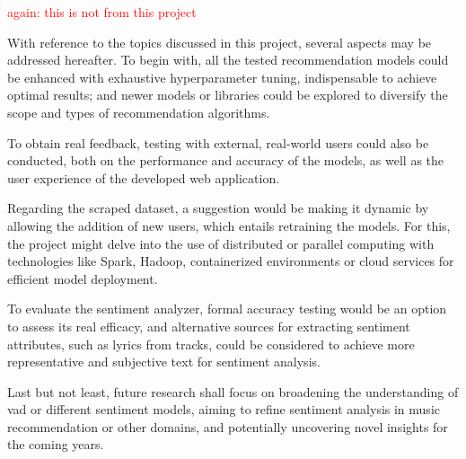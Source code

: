 \textcolor{red}{again: this is not from this project}

With reference to the topics discussed in this project, several aspects may be addressed hereafter. To begin with, all the tested recommendation models could be enhanced with exhaustive hyperparameter tuning, indispensable to achieve optimal results; and newer models or libraries could be explored to diversify the scope and types of recommendation algorithms.

To obtain real feedback, testing with external, real-world users could also be conducted, both on the performance and accuracy of the models, as well as the user experience of the developed web application.

Regarding the scraped dataset, a suggestion would be making it dynamic by allowing the addition of new users, which entails retraining the models. For this, the project might delve into the use of distributed or parallel computing with technologies like Spark, Hadoop, containerized environments or cloud services for efficient model deployment.

To evaluate the sentiment analyzer, formal accuracy testing would be an option to assess its real efficacy, and alternative sources for extracting sentiment attributes, such as lyrics from tracks, could be considered to achieve more representative and subjective text for sentiment analysis.

Last but not least, future research shall focus on broadening the understanding of \acs{vad} or different sentiment models, aiming to refine sentiment analysis in music recommendation or other domains, and potentially uncovering novel insights for the coming years.